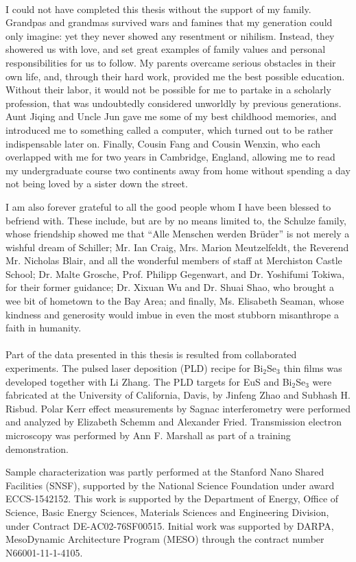 \paragraph{}
I could not have completed this thesis without the support of my family. Grandpas and grandmas survived wars and famines that my generation could only imagine: yet they never showed any resentment or nihilism. Instead, they showered us with love, and set great examples of family values and personal responsibilities for us to follow. My parents overcame serious obstacles in their own life, and, through their hard work, provided me the best possible education. Without their labor, it would not be possible for me to partake in a scholarly profession, that was undoubtedly considered unworldly by previous generations. Aunt Jiqing and Uncle Jun gave me some of my best childhood memories, and introduced me to something called a computer, which turned out to be rather indispensable later on. Finally, Cousin Fang and Cousin Wenxin, who each overlapped with me for two years in Cambridge, England, allowing me to read my undergraduate course two continents away from home without spending a day not being loved by a sister down the street.

I am also forever grateful to all the good people whom I have been blessed to befriend with. These include, but are by no means limited to, the Schulze family, whose friendship showed me that ``Alle Menschen werden Br\"uder'' is not merely a wishful dream of Schiller; Mr. Ian Craig, Mrs. Marion Meutzelfeldt, the Reverend Mr. Nicholas Blair, and all the wonderful members of staff at Merchiston Castle School; Dr. Malte Grosche, Prof. Philipp Gegenwart, and Dr. Yoshifumi Tokiwa, for their former guidance; Dr. Xixuan Wu and Dr. Shuai Shao, who brought a wee bit of hometown to the Bay Area; and finally, Ms. Elisabeth Seaman, whose kindness and generosity would imbue in even the most stubborn misanthrope a faith in humanity.

\paragraph{}
Part of the data presented in this thesis is resulted from collaborated experiments. The pulsed laser deposition (PLD) recipe for Bi$_2$Se$_3$ thin films was developed together with Li Zhang. The PLD targets for EuS and Bi$_2$Se$_3$ were fabricated at the University of California, Davis, by Jinfeng Zhao and Subhash H. Risbud. Polar Kerr effect measurements by Sagnac interferometry were performed and analyzed by Elizabeth Schemm and Alexander Fried. Transmission electron microscopy was performed by Ann F. Marshall as part of a training demonstration.

Sample characterization was partly performed at the Stanford Nano Shared Facilities (SNSF), supported by the National Science Foundation under award ECCS-1542152.  This work is supported by the Department of Energy,  Office of Science, Basic Energy Sciences, Materials Sciences and Engineering Division, under Contract DE-AC02-76SF00515. Initial work was supported by DARPA, MesoDynamic Architecture Program (MESO) through the contract number N66001-11-1-4105.